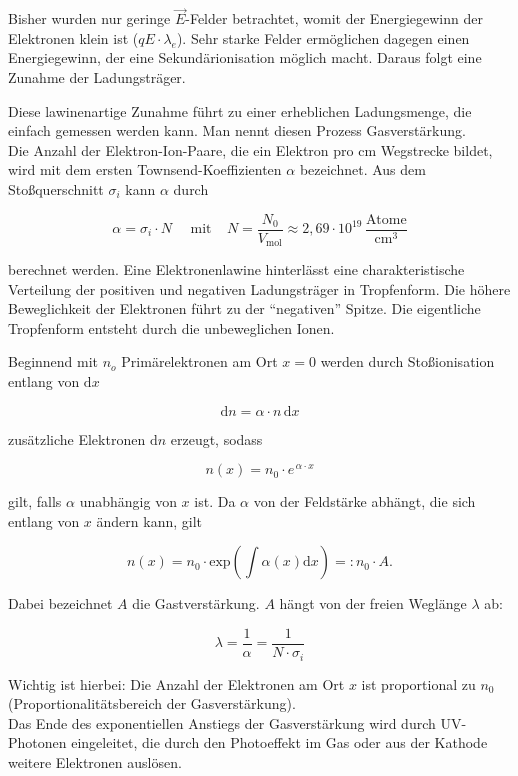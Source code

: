 Bisher wurden nur geringe $\vec{E}$-Felder betrachtet, womit der Energiegewinn der Elektronen klein
ist ($qE\cdot\lambda_e$). Sehr starke Felder ermöglichen dagegen einen Energiegewinn, der eine
Sekundärionisation möglich macht. Daraus folgt eine Zunahme der Ladungsträger.

\begin{figure}[H]
		\centering
		
\end{figure}

Diese lawinenartige Zunahme führt zu einer erheblichen Ladungsmenge, die einfach gemessen werden
kann. Man nennt diesen Prozess Gasverstärkung.
\\
Die Anzahl der Elektron-Ion-Paare, die ein Elektron pro cm Wegstrecke bildet, wird mit dem ersten
Townsend-Koeffizienten $\alpha$ bezeichnet. Aus dem Stoßquerschnitt $\sigma_i$ kann $\alpha$ durch 

\[\alpha = \sigma_i\cdot N~~~~~~\text{mit}~~~~~ N=\frac{N_0}{V_{\text{mol}}}\approx
2{,}69\cdot10^{19}\,\frac{\text{Atome}}{\text{cm}^3} \]

berechnet werden. Eine Elektronenlawine hinterlässt eine charakteristische Verteilung der positiven
und negativen Ladungsträger in Tropfenform. Die höhere Beweglichkeit der Elektronen führt zu der
"`negativen"' Spitze. Die eigentliche Tropfenform entsteht durch die
unbeweglichen Ionen.

\begin{figure}[H]
		\centering
		
\end{figure}

Beginnend mit $n_o$ Primärelektronen am Ort $x=0$ werden durch Stoßionisation entlang von
$\mathrm{d}x$

\[ \mathrm{d}n = \alpha\cdot n\, \mathrm{d}x  \]

zusätzliche Elektronen $\mathrm{d}n$ erzeugt, sodass

\[n(x)=n_0\cdot e^{\,\alpha\cdot x}   \]

gilt, falls $\alpha$ unabhängig von $x$ ist. Da $\alpha$ von der Feldstärke abhängt, die sich
entlang von $x$ ändern kann, gilt

\[n(x)=n_0\cdot \text{exp}\left(\int\alpha(x)\mathrm{d}x \right)=:n_0\cdot A  .\]

Dabei bezeichnet $A$ die Gastverstärkung. $A$ hängt von der freien Weglänge $\lambda$ ab:

\[\lambda =\frac{1}{\alpha}=\frac{1}{N\cdot\sigma_i}  \]

Wichtig ist hierbei: Die Anzahl der Elektronen am Ort $x$ ist proportional zu $n_0$
(Proportionalitätsbereich der Gasverstärkung).
\\
Das Ende des exponentiellen Anstiegs der Gasverstärkung wird durch UV-Photonen eingeleitet, die
durch den Photoeffekt im Gas oder aus der Kathode weitere Elektronen auslösen.

